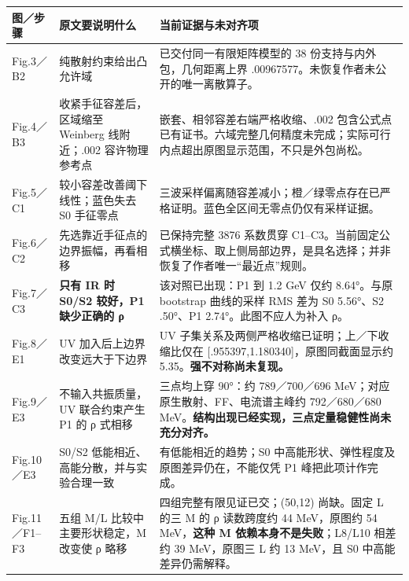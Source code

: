 \documentclass[
  11pt,
  a4paper,
]{article}
\newcounter{none} %
\begin{document}
{\def\LTcaptype{none} %
\begin{longtable}[]{@{}
  >{\raggedright\arraybackslash}p{}
  >{\raggedright\arraybackslash}p{}
  >{\raggedright\arraybackslash}p{}@{}}
\toprule\noalign{}
\begin{minipage}[b]{\linewidth}\raggedright
图／步骤
\end{minipage} & \begin{minipage}[b]{\linewidth}\raggedright
原文要说明什么
\end{minipage} & \begin{minipage}[b]{\linewidth}\raggedright
当前证据与未对齐项
\end{minipage} \\
\midrule\noalign{}
\endhead
\bottomrule\noalign{}
\endlastfoot
Fig.3／B2 & 纯散射约束给出凸允许域 & 已交付同一有限矩阵模型的 38
份支持与内外包，几何距离上界
.00967577。未恢复作者未公开的唯一离散算子。 \\
Fig.4／B3 & 收紧手征容差后，区域缩至 Weinberg 线附近；.002
容许物理参考点 & 嵌套、相邻容差右端严格收缩、.002
包含公式点已有证书。六域完整几何精度未完成；实际可行内点超出原图显示范围，不只是外包尚松。 \\
Fig.5／C1 & 较小容差改善阈下线性；蓝色失去 S0 手征零点 &
三波采样偏离随容差减小；橙／绿零点存在已严格证明。蓝色全区间无零点仍仅有采样证据。 \\
Fig.6／C2 & 先选靠近手征点的边界振幅，再看相移 & 已保持完整 3876
系数贯穿
C1--C3。当前固定公式横坐标、取上侧局部边界，是具名选择；并非恢复了作者唯一``最近点''规则。 \\
Fig.7／C3 & \textbf{只有 IR 时 S0/S2 较好，P1 缺少正确的 ρ} &
该对照已出现：P1 到 1.2 GeV 仅约 8.64°。与原 bootstrap 曲线的采样 RMS
差为 S0 5.56°、S2 .50°、P1 2.74°。此图不应人为补入 ρ。 \\
Fig.8／E1 & UV 加入后上边界改变远大于下边界 & UV
子集关系及两侧严格收缩已证明；上／下收缩比仅在
{[}.955397,1.180340{]}，原图同截面显示约
5.35。\textbf{强不对称尚未复现。} \\
Fig.9／E3 & 不输入共振质量，UV 联合约束产生 P1 的 ρ 式相移 & 三点均上穿
90°：约 789／700／696 MeV；对应原生散射、FF、电流谱主峰约 792／680／680
MeV。\textbf{结构出现已经实现，三点定量稳健性尚未充分对齐。} \\
Fig.10／E3 & S0/S2 低能相近、高能分散，并与实验合理一致 &
有低能相近的趋势；S0 中高能形状、弹性程度及原图差异仍在，不能仅凭 P1
峰把此项计作完成。 \\
Fig.11／F1--F3 & 五组 M/L 比较中主要形状稳定，M 改变使 ρ 略移 &
四组完整有限见证已交；(50,12) 尚缺。固定 L 的三 M 的 ρ 读数跨度约 44
MeV，原图约 54 MeV，\textbf{这种 M 依赖本身不是失败}；L8/L10 相差约 39
MeV，原图三 L 约 13 MeV，且 S0 中高能差异仍需解释。 \\
\end{longtable}
}
\end{document}
